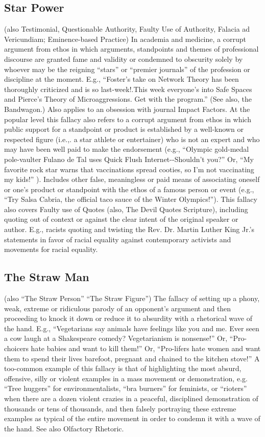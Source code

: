 \documentclass[10pt,a4paper,british]{article}
\begin{document}
\begin{multicols}{2}
	\subsection{Star Power} (also Testimonial, Questionable Authority, Faulty Use of Authority, Falacia ad Vericundiam; Eminence{-}based Practice) In academia and medicine, a corrupt argument from ethos in which arguments, standpoints and themes of professional discourse are granted fame and validity or condemned to obscurity solely by whoever may be the reigning ``stars'' or ``premier journals'' of the profession or discipline at the moment. E.g., ``Foster's take on Network Theory has been thoroughly criticized and is so last{-}week!.This week everyone's into Safe Spaces and Pierce's Theory of Microaggressions. Get with the program.'' (See also, the Bandwagon.) Also applies to an obsession with journal Impact Factors. At the popular level this fallacy also refers to a corrupt argument from ethos in which public support for a standpoint or product is established by a well{-}known or respected figure (i.e.,. a star athlete or entertainer) who is not an expert and who may have been well paid to make the endorsement (e.g., ``Olympic gold{-}medal pole{-}vaulter Fulano de Tal uses Quick Flush Internet{-}{-}Shouldn’t you?'' Or, ``My favorite rock star warns that vaccinations spread cooties, so I'm not vaccinating my kids!'' ). Includes other false, meaningless or paid means of associating oneself or one’s product or standpoint with the ethos of a famous person or event (e.g., “Try Salsa Cabria, the official taco sauce of the Winter Olympics!”). This fallacy also covers Faulty use of Quotes (also, The Devil Quotes Scripture), including quoting out of context or against the clear intent of the original speaker or author.  E.g., racists quoting and twisting the Rev. Dr. Martin Luther King Jr.'s statements in favor of racial equality against contemporary activists and movements for racial equality.  

	\subsection{The Straw Man} (also ``The Straw Person'' ``The Straw Figure'') The fallacy of setting up a phony, weak, extreme or ridiculous parody of an opponent's argument and then proceeding to knock it down or reduce it to absurdity with a rhetorical wave of the hand. E.g., ``Vegetarians say animals have feelings like you and me. Ever seen a cow laugh at a Shakespeare comedy? Vegetarianism is nonsense!'' Or, ``Pro{-}choicers hate babies and want to kill them!'' Or, ``Pro{-}lifers hate women and want them to spend their lives barefoot, pregnant and chained to the kitchen stove!'' A too{-}common example of this fallacy is that of highlighting the most absurd, offensive, silly or violent examples in a mass movement or demonstration, e.g. ``Tree huggers'' for environmentalists, ``bra burners'' for feminists, or ``rioters'' when there are a dozen violent crazies in a peaceful, disciplined demonstration of thousands or tens of thousands, and then falsely portraying these extreme examples as typical of the entire movement in order to condemn it with a wave of the hand. See also Olfactory Rhetoric.  


\end{multicols}
\end{document}

